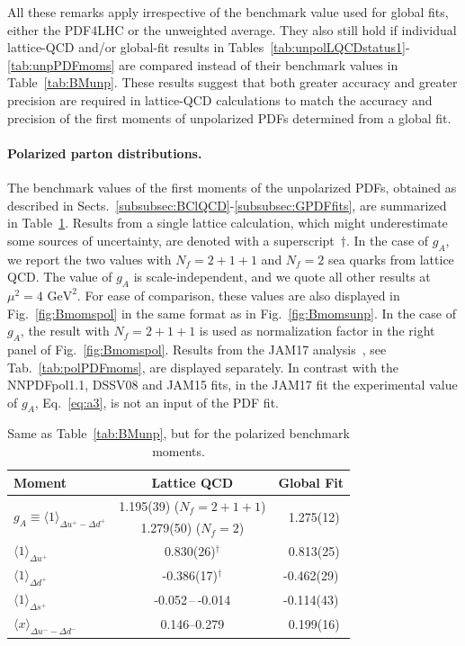 All these remarks apply irrespective of the benchmark value used for 
global fits, either the PDF4LHC or the unweighted average.
%
They also still hold if individual lattice-QCD and/or global-fit
results in Tables~\ref{tab:unpolLQCDstatus1}-\ref{tab:unpPDFmoms} are 
compared instead of their benchmark values in Table~\ref{tab:BMunp}. 
%
These results suggest that both greater accuracy and greater precision are
required in lattice-QCD calculations to match the accuracy and 
precision of the first moments of unpolarized PDFs determined from a global
fit.

\paragraph{Polarized parton distributions.}
%
The benchmark values of the first moments of the unpolarized PDFs, obtained
as described in Sects.~\ref{subsubsec:BClQCD}-\ref{subsubsec:GPDFfits}, 
are summarized in Table~\ref{tab:BMpol}.
%
Results from a single lattice calculation, which might underestimate some 
sources of uncertainty, are denoted with a superscript~$\dagger$.
%
In the case of $g_A$, we report the two values with $N_f=2+1+1$ and
$N_f=2$ sea quarks from lattice QCD.
%
The value of $g_A$ is scale-independent, and we quote all other results at 
$\mu^2=4\mbox{ GeV}^2$.
%
For ease of comparison, these values are also displayed in 
Fig.~\ref{fig:Bmomspol} in the same format as in Fig.~\ref{fig:Bmomsunp}.
%
In the case of $g_A$, the result with $N_f=2+1+1$ is used as normalization
factor in the right panel of Fig.~\ref{fig:Bmomspol}.
%
Results from the JAM17 analysis~\cite{Ethier:2017zbq}, see 
Tab.~\ref{tab:polPDFmoms}, are displayed separately.
%
In contrast with the NNPDFpol1.1, DSSV08 and JAM15 fits, in the JAM17 fit 
the experimental value of $g_A$, Eq.~\eqref{eq:a3}, 
is not an input of the PDF fit.

\begin{table}[!t]
\centering
\renewcommand{\arraystretch}{1.2}
\begin{tabular}{lcc}
\toprule
Moment & Lattice QCD & Global Fit\\
\midrule
\multirow{2}{*}{$g_A\equiv\langle 1\rangle_{\Delta u^+ - \Delta d^+}$} 
& 1.195(39) ($N_f=2+1+1$) 
& \multirow{2}{*}{\ 1.275(12)} \\
& 1.279(50) ($N_f=2$) & \\
$\langle 1 \rangle_{\Delta u^+}$     
& 0.830(26)$^\dagger$ 
& \ 0.813(25)\\
$\langle 1 \rangle_{\Delta d^+}$     
& -0.386(17)$^\dagger$ 
& -0.462(29)\\
$\langle 1 \rangle_{\Delta s^+}$     
& -0.052\,--\,-0.014
& -0.114(43)\\
$\langle x\rangle_{\Delta u^- - \Delta d^-}$       
& \numrange{0.146}{0.279} 
& \ 0.199(16)\\
\bottomrule
\end{tabular}
\caption{\small Same as Table~\ref{tab:BMunp}, but for the polarized benchmark 
moments.}
\label{tab:BMpol}
\end{table}

